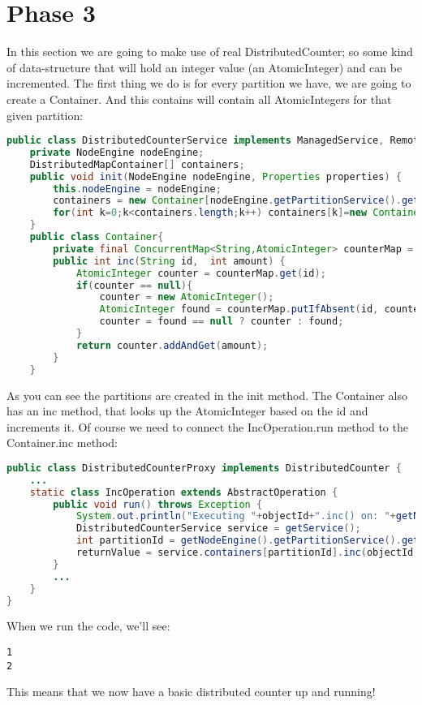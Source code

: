 \section{Phase 3}
In this section we are going to make use of real DistributedCounter; so some kind of data-structure that will hold an integer value (an AtomicInteger) and can be incremented. The first thing we do is for every partition we have, we are going to create a Container. And this contains will contain all AtomicIntegers for that given partition:
\begin{lstlisting}[language=java]
public class DistributedCounterService implements ManagedService, RemoteService {
    private NodeEngine nodeEngine;
    DistributedMapContainer[] containers;
    public void init(NodeEngine nodeEngine, Properties properties) {
        this.nodeEngine = nodeEngine;
        containers = new Container[nodeEngine.getPartitionService().getPartitionCount()];
        for(int k=0;k<containers.length;k++) containers[k]=new Container();
    }
    public class Container{
        private final ConcurrentMap<String,AtomicInteger> counterMap = new ConcurrentHashMap<>();
        public int inc(String id,  int amount) {
            AtomicInteger counter = counterMap.get(id);
            if(counter == null){
                counter = new AtomicInteger();
                AtomicInteger found = counterMap.putIfAbsent(id, counter);
                counter = found == null ? counter : found;
            }
            return counter.addAndGet(amount);
        }
    }
\end{lstlisting}
As you can see the partitions are created in the init method. The Container also has an inc method, that looks up the AtomicInteger based on the id and increments it. Of course we need to connect the IncOperation.run method to the Container.inc method:
\begin{lstlisting}[language=java]
public class DistributedCounterProxy implements DistributedCounter {
    ... 
    static class IncOperation extends AbstractOperation {
        public void run() throws Exception {
            System.out.println("Executing "+objectId+".inc() on: "+getNodeEngine().getThisAddress());
            DistributedCounterService service = getService();
            int partitionId = getNodeEngine().getPartitionService().getPartitionId(objectId);
            returnValue = service.containers[partitionId].inc(objectId, amount);
        }
        ...
    }
}
\end{lstlisting}
When we run the code, we'll see:
\begin{lstlisting}
1
2
\end{lstlisting}
This means that we now have a basic distributed counter up and running!

